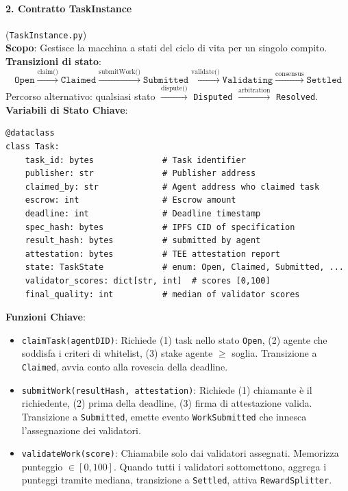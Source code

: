 \documentclass[11pt]{article}
\begin{document}
\paragraph{2. Contratto TaskInstance} (\texttt{TaskInstance.py})\\
\textbf{Scopo}: Gestisce la macchina a stati del ciclo di vita per un singolo compito.\\
\textbf{Transizioni di stato}:
\begin{equation}
\texttt{Open} \xrightarrow{\text{claim()}} \texttt{Claimed} \xrightarrow{\text{submitWork()}} \texttt{Submitted} \xrightarrow{\text{validate()}} \texttt{Validating} \xrightarrow{\text{consensus}} \texttt{Settled}
\end{equation}
Percorso alternativo: qualsiasi stato $\xrightarrow{\text{dispute()}}$ \texttt{Disputed} $\xrightarrow{\text{arbitration}}$ \texttt{Resolved}.\\
\textbf{Variabili di Stato Chiave}:
\begin{verbatim}
@dataclass
class Task:
    task_id: bytes              # Task identifier
    publisher: str              # Publisher address
    claimed_by: str             # Agent address who claimed task
    escrow: int                 # Escrow amount
    deadline: int               # Deadline timestamp
    spec_hash: bytes            # IPFS CID of specification
    result_hash: bytes          # submitted by agent
    attestation: bytes          # TEE attestation report
    state: TaskState            # enum: Open, Claimed, Submitted, ...
    validator_scores: dict[str, int]  # scores [0,100]
    final_quality: int          # median of validator scores
\end{verbatim}
\textbf{Funzioni Chiave}:
\begin{itemize}[noitemsep]
  \item \texttt{claimTask(agentDID)}: Richiede (1) task nello stato \texttt{Open}, (2) agente che soddisfa i criteri di whitelist, (3) stake agente $\geq$ soglia. Transizione a \texttt{Claimed}, avvia conto alla rovescia della deadline.
  \item \texttt{submitWork(resultHash, attestation)}: Richiede (1) chiamante è il richiedente, (2) prima della deadline, (3) firma di attestazione valida. Transizione a \texttt{Submitted}, emette evento \texttt{WorkSubmitted} che innesca l'assegnazione dei validatori.
  \item \texttt{validateWork(score)}: Chiamabile solo dai validatori assegnati. Memorizza punteggio $\in [0,100]$. Quando tutti i validatori sottomettono, aggrega i punteggi tramite mediana, transizione a \texttt{Settled}, attiva \texttt{RewardSplitter}.
\end{itemize}
\end{document}
